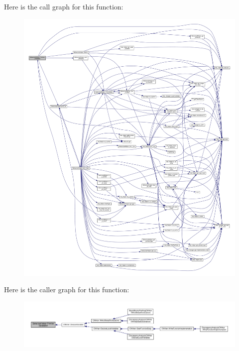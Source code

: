 Here is the call graph for this function\+:
\nopagebreak
\begin{figure}[H]
\begin{center}
\leavevmode
\includegraphics[width=350pt]{dd/db2/classBehavioralHelper_a615ea10adbdd1adaefb26e4f622c0ec7_cgraph}
\end{center}
\end{figure}
Here is the caller graph for this function\+:
\nopagebreak
\begin{figure}[H]
\begin{center}
\leavevmode
\includegraphics[width=350pt]{dd/db2/classBehavioralHelper_a615ea10adbdd1adaefb26e4f622c0ec7_icgraph}
\end{center}
\end{figure}
\mbox{\label{classBehavioralHelper_ab93bdf8fecf2a9740d9bc2cd65421a64}} 
